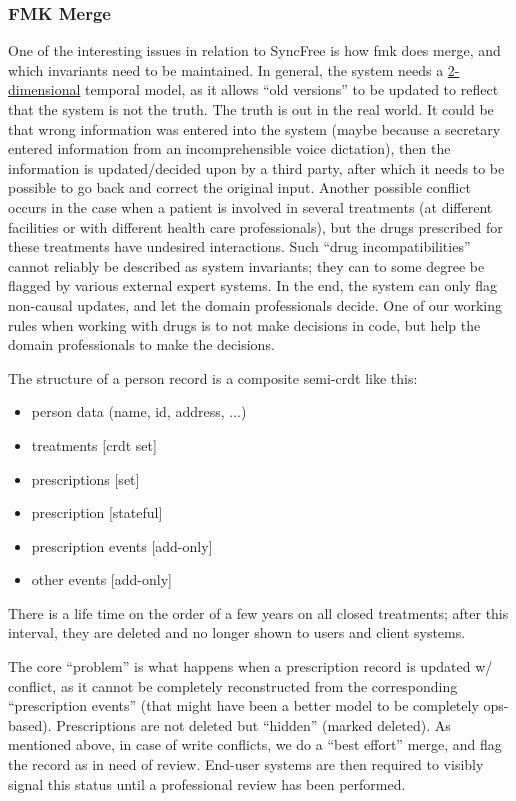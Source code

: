 \documentclass[11pt,a4paper]{report}
\begin{document}
\subsubsection{FMK Merge}
One of the interesting issues in relation to SyncFree is how \gls{fmk} does merge, and which invariants need to be maintained.
In general, the system needs a \href{http://en.wikipedia.org/wiki/Bitemporal_data}{2-dimensional} temporal model, as it allows ``old versions'' to be updated to reflect that the system is not the truth. The truth is out in the real world. It could be that wrong information was entered into the system (maybe because a secretary entered information from an incomprehensible voice dictation), then the information is updated/decided upon by a third party, after which it needs to be possible to go back and correct the original input. Another possible conflict occurs in the case when a patient is involved in several treatments (at different facilities or with different health care professionals), but the drugs prescribed for these treatments have undesired interactions. Such ``drug incompatibilities'' cannot reliably be described as system invariants; they can to some degree be flagged by various external expert systems. In the end, the system can only flag non-causal updates, and let the domain professionals decide. One of our working rules when working with drugs is to not make decisions in code, but help the domain professionals to make the decisions.

The structure of a person record is a composite semi-\gls{crdt} like this:
\begin{itemize}
	\item person data (name, id, address, ...)
	\item treatments [\gls{crdt} set]
	\item prescriptions [set]
	\item prescription [stateful]
	\item prescription events [add-only]
	\item other events [add-only]
\end{itemize}


There is a life time on the order of a few years on all closed treatments; after this interval, they are deleted and no longer shown to users and client systems.

The core ``problem'' is what happens when a prescription record is updated w/ conflict, as it cannot be completely reconstructed from the corresponding ``prescription events'' (that might have been a better model to be completely ops-based). Prescriptions are not deleted but ``hidden'' (marked deleted). As mentioned above, in case of write conflicts, we do a ``best effort'' merge, and flag the record as in need of review. End-user systems are then required to visibly signal this status until a professional review has been performed.
\end{document}
